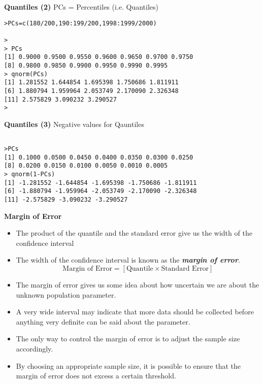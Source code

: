 \documentclass[]{report}
\begin{document}
\noindent \textbf{Quantiles (2)}
PCs = Percentiles (i.e. Quantiles)
\begin{verbatim}
>PCs=c(180/200,190:199/200,1998:1999/2000)

>
> PCs
[1] 0.9000 0.9500 0.9550 0.9600 0.9650 0.9700 0.9750
[8] 0.9800 0.9850 0.9900 0.9950 0.9990 0.9995
> qnorm(PCs)
[1] 1.281552 1.644854 1.695398 1.750686 1.811911
[6] 1.880794 1.959964 2.053749 2.170090 2.326348
[11] 2.575829 3.090232 3.290527
>
\end{verbatim}

\noindent \textbf{Quantiles (3)}
Negative values for Qauntiles
\begin{verbatim}

>PCs
[1] 0.1000 0.0500 0.0450 0.0400 0.0350 0.0300 0.0250
[8] 0.0200 0.0150 0.0100 0.0050 0.0010 0.0005
> qnorm(1-PCs)
[1] -1.281552 -1.644854 -1.695398 -1.750686 -1.811911
[6] -1.880794 -1.959964 -2.053749 -2.170090 -2.326348
[11] -2.575829 -3.090232 -3.290527
\end{verbatim}








\noindent \textbf{Margin of Error}

\begin{itemize}
\item The product of the quantile and the standard error give us the width of the confidence interval
\item The width of the confidence interval is known as the \textbf{\emph{margin of error}}.  \[ \mbox{Margin of Error}  = \left[ \mbox{Quantile} \times \mbox{Standard Error} \right] \]
\item The margin of error gives us some idea about how uncertain we are about the unknown population parameter. \item A very wide interval may indicate that more data should be collected before anything very definite can be said about the parameter.
\item The only way to control the margin of error is to adjust the sample size accordingly.
\item By choosing an appropriate sample size, it is possible to ensure that the margin of error does not excess a certain threshold.
\end{itemize}
\end{document}
